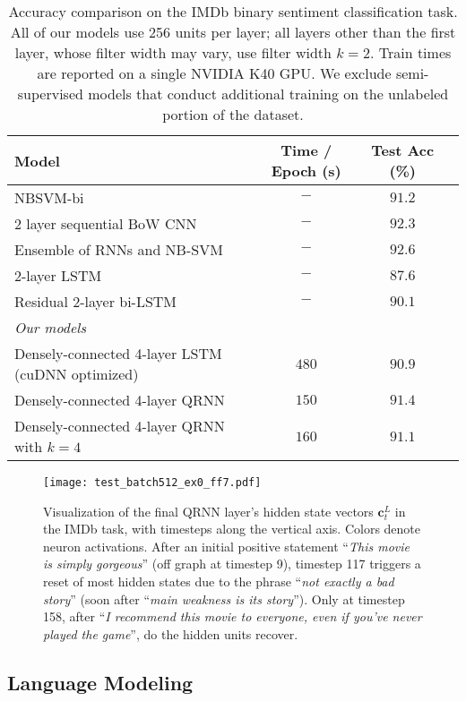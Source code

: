 \documentclass{article} \usepackage{iclr2017_conference,times}
\begin{document}
\begin{table*}
\center
\begin{tabular}{l|ccc}
\toprule
\bf Model & \bf Time / Epoch (s) & \bf Test Acc (\%) \\
\midrule
NBSVM-bi \citep{Wang2012} & $-$ & $91.2$\\
2 layer sequential BoW CNN \citep{Johnson2014} & $-$ & $92.3$ \\
Ensemble of RNNs and NB-SVM \citep{Mesnil2014} & $-$ & $92.6$ \\
2-layer LSTM \citep{Longpre2016} & $-$ & $87.6$ \\
Residual 2-layer bi-LSTM \citep{Longpre2016} & $-$ & $90.1$ \\
\midrule
{\it Our models}\\
Densely-connected 4-layer LSTM (cuDNN optimized) & $480$ & $90.9$ \\
Densely-connected 4-layer QRNN & $150$ & $91.4$ \\
Densely-connected 4-layer QRNN with $k=4$ & $160$ & $91.1$ \\
\bottomrule
\end{tabular}
\caption{
Accuracy comparison on the IMDb binary sentiment classification task. All of our models use 256 units per layer; all layers other than the first layer, whose filter width may vary, use filter width $k=2$. Train times are reported on a single NVIDIA K40 GPU. We exclude semi-supervised models that conduct additional training on the unlabeled portion of the dataset.
}
\label{table:IMDb}
\end{table*}

\begin{figure}
\centering
\texttt{[image: test\_batch512\_ex0\_ff7.pdf]}
\caption{Visualization of the final QRNN layer's hidden state vectors $\mathbf{c}^L_t$ in the IMDb task, with timesteps along the vertical axis. Colors denote neuron activations.
After an initial positive statement ``\textit{This movie is simply gorgeous}'' (off graph at timestep 9), timestep 117 triggers a reset of most hidden states due to the phrase ``\textit{not exactly a bad story}'' (soon after ``\textit{main weakness is its story}'').
Only at timestep 158, after ``\textit{I recommend this movie to everyone, even if you've never played the game}'', do the hidden units recover.}
\label{fig:IMDBviz}
\end{figure}

\subsection{Language Modeling}
\end{document}
